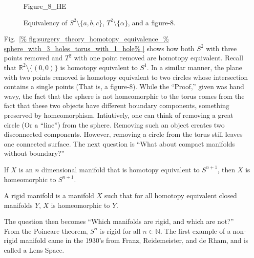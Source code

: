 \documentclass[crop=false,class=article,oneside]{standalone}
\begin{document}
        \begin{figure}[H]
                \centering
                \captionsetup{type=figure}
                {Figure_8_HE}
                \caption{Equivalency of $S^{2}\setminus\{a,b,c\}$,
                         $T^{2}\setminus\{\alpha\}$, and a figure-8.}
                \label{fig:surgery_theory_homotopy_equivalence_%
                       sphere_with_3_holes_torus_with_1_hole}
        \end{figure} 
        Fig.~\ref{%
            fig:surgery_theory_homotopy_equivalence_%
            sphere_with_3_holes_torus_with_1_hole%
        }
        shows how both $S^{2}$ with three points
        removed and $T^{2}$ with one point removed are
        homotopy equivalent. Recall that
        $\mathbb{R}^{2}\setminus \{(0,0)\}$ is homotopy
        equivalent to $S^{1}$. In a similar manner,
        the plane with two points removed is homotopy
        equivalent to two circles whose intersection
        contains a single points (That is, a figure-$8$).
        While the ``Proof,'' given was hand wavy,
        the fact that the sphere is not homeomorphic to the
        torus comes from the fact that these two objects
        have different boundary components, something
        preserved by homeomorphism. Intiutively,
        one can think of removing a great circle
        (Or a ``line'') from the sphere.
        Removing such an object creates two disconnected
        components. However, removing a circle from the
        torus still leaves one connected surface.
        The next question is
        ``What about compact manifolds without boundary?''
        \begin{theorem}
            If $X$ is an $n$ dimensional manifold that
            is homotopy equivalent to $S^{n+1}$, then $X$
            is homeomorphic to $S^{n+1}$.
        \end{theorem}
        \begin{definition}
            A rigid manifold is a manifold $X$ such that
            for all homotopy equivalent closed manifolds $Y$,
            $X$ is homeomorphic to $Y$.
        \end{definition}
        The question then becomes
        ``Which manifolds are rigid, and which are not?''
        From the Poincare theorem, $S^{n}$ is rigid for all
        $n\in\mathbb{N}$. The first example of a non-rigid
        manifold came in the 1930's from Franz, Reidemeister,
        and de Rham, and is called a Lens Space.
\end{document}
